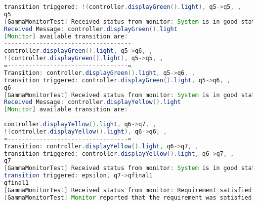\begin{lstlisting}[language=java, caption={\textit{Gamma} monitor kimenet rendőrségi példa.},captionpos=b,label=gamma_monitor_output2]
transition triggered: !(controller.displayGreen().light), q5->q5, ,
q5
[GammaMonitorTest] Received status from monitor: System is in good state.
Received Message: controller.displayGreen().light
[Monitor] available transition are:
------------------------------------
controller.displayGreen().light, q5->q6, ,
!(controller.displayGreen().light), q5->q5, ,
=----------------------------------=
Transition: controller.displayGreen().light, q5->q6, ,
transition triggered: controller.displayGreen().light, q5->q6, ,
q6
[GammaMonitorTest] Received status from monitor: System is in good state.
Received Message: controller.displayYellow().light
[Monitor] available transition are:
------------------------------------
controller.displayYellow().light, q6->q7, ,
!(controller.displayYellow().light), q6->q6, ,
=----------------------------------=
Transition: controller.displayYellow().light, q6->q7, ,
transition triggered: controller.displayYellow().light, q6->q7, ,
q7
[GammaMonitorTest] Received status from monitor: System is in good state.
transition triggered: epsilon, q7->qfinal1
qfinal1
[GammaMonitorTest] Received status from monitor: Requirement satisfied
[GammaMonitorTest] Monitor reported that the requirement was satisfied    
\end{lstlisting}

